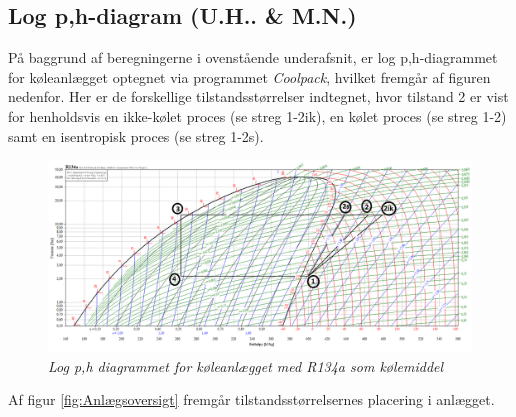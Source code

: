 \documentclass[../Hovedrapport.tex]{subfiles}
\begin{document}
\subsection{Log p,h-diagram (U.H.. \& M.N.)}
    \label{sec:logphdiagram}
På baggrund af beregningerne i ovenstående underafsnit, er log p,h-diagrammet for køleanlægget optegnet via programmet \textit{Coolpack}\citep{Coolpack}, hvilket fremgår af figuren nedenfor. Her er de forskellige tilstandsstørrelser indtegnet, hvor tilstand 2 er vist for henholdsvis en ikke-kølet proces (se streg 1-2ik), en kølet proces (se streg 1-2) samt en isentropisk proces (se streg 1-2s).
\begin{figure}[H]
    \centering
    \includegraphics[width=1.0\textwidth]{Billeder/logPHdiagram.PNG}
    \caption{\textit{Log p,h diagrammet for køleanlægget med R134a som kølemiddel}}
    \label{fig:logphdiagram}
\end{figure}

Af figur \ref{fig:Anlægsoversigt} fremgår tilstandsstørrelsernes placering i anlægget. 
\end{document}
